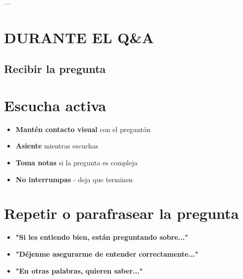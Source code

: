 \documentclass[a4paper,11pt]{article}
\begin{document}
\vspace{0.2cm}

---

\vspace{0.2cm}

\section{DURANTE EL Q&A}

\vspace{0.2cm}

\subsection{Recibir la pregunta}

\vspace{0.2cm}

\section{Escucha activa}

\begin{itemize}

  \item \textbf{Mantén contacto visual} con el preguntón

  \item \textbf{Asiente} mientras escuchas

  \item \textbf{Toma notas} si la pregunta es compleja

  \item \textbf{No interrumpas} - deja que terminen

\end{itemize}

\vspace{0.2cm}

\section{Repetir o parafrasear la pregunta}

\begin{itemize}

  \item \textbf{"Si les entiendo bien, están preguntando sobre..."}

  \item \textbf{"Déjenme asegurarme de entender correctamente..."}

  \item \textbf{"En otras palabras, quieren saber..."}

\end{itemize}
\end{document}

